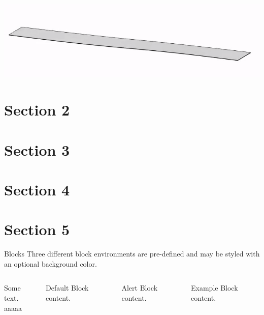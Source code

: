 \documentclass[10pt]{beamer}
\begin{document}
    \includegraphics[scale=0.1]{Pictures/flatbelt.png}

\section{Section 2}

\section{Section 3}

\section{Section 4}

\section{Section 5}

\begin{frame}{Blocks}
    Three different block environments are pre-defined and may be styled with an
    optional background color.
  
    \begin{columns}[T,onlytextwidth]
          
            Some text.\\[2cm]
            aaaaa
    
    
          \begin{block}{Default}
            Block content.
          \end{block}
    
          \begin{alertblock}{Alert}
            Block content.
          \end{alertblock}
    
          \begin{exampleblock}{Example}
            Block content.
          \end{exampleblock}
    
      \end{columns}

  \end{frame}
\end{document}
